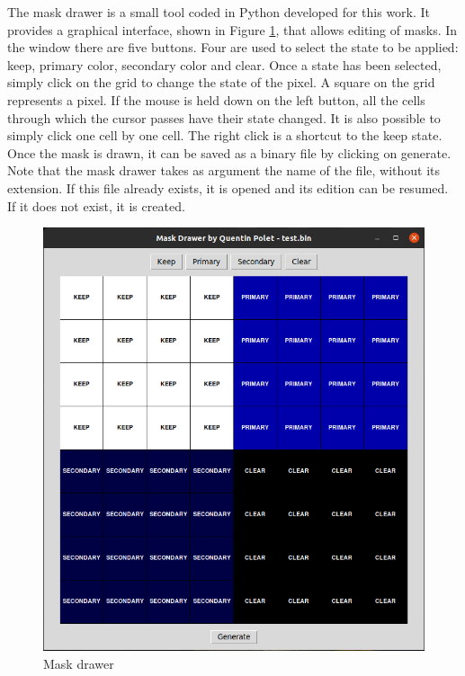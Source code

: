 The mask drawer is a small tool coded in Python developed for this work. It provides a graphical 
interface, shown in Figure \ref{fig:tools/mask_drawer}, that allows editing of masks. In the window 
there are five buttons. 
Four are used to select the state to be applied: keep, primary color, secondary color and clear. 
Once a state has been selected, simply click on the grid to change the state of the pixel. A square 
on the grid represents a pixel. If the mouse is held down on the left button, all the cells through 
which the cursor passes have their state changed. It is also possible to simply click one cell 
by one cell. The right click is a shortcut to the keep state. Once the mask is drawn, it can be 
saved as a binary file by clicking on generate. Note that the mask drawer takes as argument the 
name of the file, without its extension. If this file already exists, it is opened and its edition 
can be resumed. If it does not exist, it is created. 

\begin{figure}[H]
    \centering
    \includegraphics[scale=0.5]{Chapter7-Tools-Demos/res/mask_drawer.png}
    \caption{Mask drawer}
    \label{fig:tools/mask_drawer}
\end{figure}

